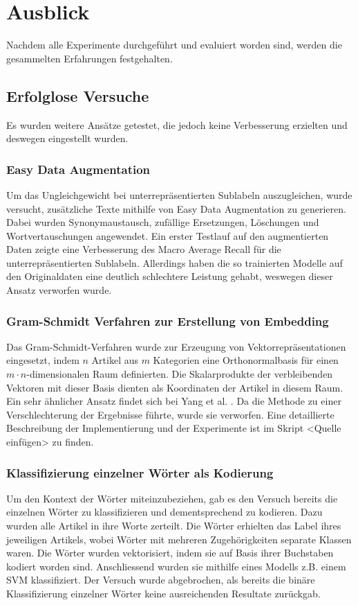 \section{Ausblick}
\label{Ausblick}
Nachdem alle Experimente durchgeführt und evaluiert worden sind, werden die gesammelten Erfahrungen festgehalten.

\subsection{Erfolglose Versuche}
Es wurden weitere Ansätze getestet, die jedoch keine Verbesserung erzielten und deswegen eingestellt wurden.

\subsubsection{Easy Data Augmentation}
\label{EDA}
Um das Ungleichgewicht bei unterrepräsentierten Sublabeln auszugleichen, wurde versucht, zusätzliche Texte mithilfe von Easy Data Augmentation \cite{Wei2019} zu generieren. Dabei wurden Synonymaustausch, zufällige Ersetzungen, Löschungen und Wortvertauschungen angewendet. Ein erster Testlauf  auf den augmentierten Daten zeigte eine Verbesserung  des Macro Average Recall für die unterrepräsentierten Sublabeln. Allerdings haben die so trainierten Modelle auf den Originaldaten eine deutlich schlechtere Leistung gehabt, weswegen dieser Ansatz verworfen wurde.

\subsubsection{Gram-Schmidt Verfahren zur Erstellung von Embedding}
\label{sec:gram}
Das Gram-Schmidt-Verfahren wurde zur Erzeugung von Vektorrepräsentationen eingesetzt, indem $n$ Artikel aus $m$ Kategorien eine Orthonormalbasis für einen $m\cdot n$-dimensionalen Raum definierten. Die Skalarprodukte der verbleibenden Vektoren mit dieser Basis dienten als Koordinaten der Artikel in diesem Raum. Ein sehr ähnlicher Ansatz findet sich bei Yang et al. \cite{Yang2019}. Da die Methode zu einer Verschlechterung der Ergebnisse führte, wurde sie verworfen. Eine detaillierte Beschreibung der Implementierung und der Experimente ist im Skript <Quelle einfügen> zu finden.

\subsubsection{Klassifizierung einzelner Wörter als Kodierung}
\label{sec:wordcoding}
Um den Kontext der Wörter miteinzubeziehen, gab es den Versuch bereits die einzelnen Wörter zu klassifizieren und dementsprechend zu kodieren. Dazu wurden alle Artikel in ihre Worte zerteilt. Die Wörter erhielten das Label ihres jeweiligen Artikels, wobei Wörter mit mehreren Zugehörigkeiten separate Klassen waren. Die Wörter wurden vektorisiert, indem sie auf Basis ihrer Buchstaben kodiert worden sind. Anschliessend wurden sie mithilfe eines Modells z.B. einem SVM klassifiziert. Der Versuch wurde abgebrochen, als bereits die binäre Klassifizierung einzelner Wörter keine ausreichenden Resultate zurückgab.

